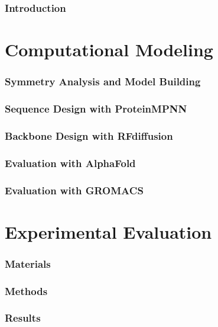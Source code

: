 \documentclass[12pt]{article}
\theoremstyle{definition}
\begin{document}
\tableofcontents
\clearpage

\section{Introduction}\label{ch:introduction}

\FloatBarrier

% 

\part{Computational Modeling}
\section{Symmetry Analysis and Model Building}\label{ch:symmetry}

\FloatBarrier

\section{Sequence Design with ProteinMPNN}\label{ch:pmpnn}

\FloatBarrier

\section{Backbone Design with RFdiffusion}\label{ch:rfdiffusion}

\FloatBarrier

\section{Evaluation with AlphaFold}\label{ch:alphafold}

\FloatBarrier

\section{Evaluation with GROMACS}\label{ch:gromacs}

\FloatBarrier

\part{Experimental Evaluation}
\section{Materials}\label{ch:materials}


\section{Methods}\label{ch:methods}


\section{Results}\label{ch:results}


\clearpage



\clearpage
\printbibliography
\end{document}
